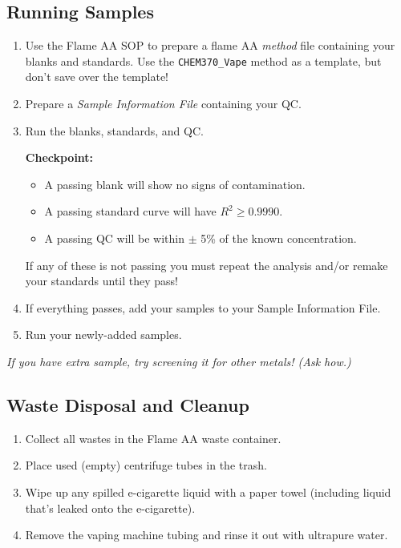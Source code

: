\documentclass[]{tufte-book}
\providecommand{\tightlist}{%
  \setlength{\itemsep}{0pt}\setlength{\parskip}{0pt}}
\begin{document}
\hypertarget{running-samples}{%
\subsection{Running Samples}\label{running-samples}}

\begin{enumerate}
\def\labelenumi{\arabic{enumi}.}
\item
  Use the Flame AA SOP to prepare a flame AA \emph{method} file containing your blanks and standards. Use the \texttt{CHEM370\_Vape} method as a template, but don't save over the template!
\item
  Prepare a \emph{Sample Information File} containing your QC.
\item
  Run the blanks, standards, and QC.

  \begin{marginfigure}
   \textbf{Checkpoint:}

   \begin{itemize}
   \tightlist
   \item
     A passing blank will show no signs of contamination.\\
   \item
     A passing standard curve will have \(R^2 \ge 0.9990\).\\
   \item
     A passing QC will be within \(\pm\) 5\% of the known concentration.
   \end{itemize}

   If any of these is not passing you must repeat the analysis and/or
   remake your standards until they pass!
   \end{marginfigure}
\item
  If everything passes, add your samples to your Sample Information File.
\item
  Run your newly-added samples.
\end{enumerate}

\emph{If you have extra sample, try screening it for other metals! (Ask how.)}

\hypertarget{waste-disposal-and-cleanup-1}{%
\subsection{Waste Disposal and Cleanup}\label{waste-disposal-and-cleanup-1}}

\begin{enumerate}
\def\labelenumi{\arabic{enumi}.}
\tightlist
\item
  Collect all wastes in the Flame AA waste container.
\item
  Place used (empty) centrifuge tubes in the trash.
\item
  Wipe up any spilled e-cigarette liquid with a paper towel (including liquid that's leaked onto the e-cigarette).
\item
  Remove the vaping machine tubing and rinse it out with ultrapure water.
\end{enumerate}
\end{document}
